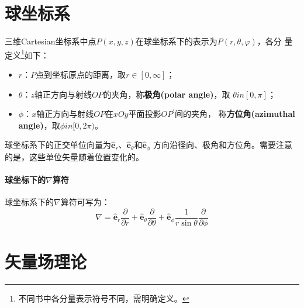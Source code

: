 \section{球坐标系}
三维Cartesian坐标系中点$P(x, y, z)$在球坐标系下的表示为$P(r, \theta, \varphi)$，各分
量定义\footnote{不同书中各分量表示符号不同，需明确定义。}如下：
\begin{itemize}
    \item $r$：$P$点到坐标原点的距离，取$r \in [0, \infty]$；
    \item $\theta$：$z$轴正方向与射线$OP$的夹角，称\textbf{极角(polar angle)}，取
                    $\theta in [0, \pi]$；
    \item $\phi$：$x$轴正方向与射线$OP$在$xOy$平面投影$OP^{\prime}$间的夹角，
                  称\textbf{方位角(azimuthal angle)}，取$\phi in [0, 2\pi)$。
\end{itemize}
球坐标系下的正交单位向量为$\hat{\bm{e}}_r$、$\hat{\bm{e}}_\theta$和$\hat{\bm{e}}_\phi$
方向沿径向、极角和方位角。需要注意的是，这些单位矢量随着位置变化的。
\paragraph*{球坐标下的$\nabla$算符}
球坐标系下的$\nabla$算符可写为：
\begin{equation}
    \nabla =  \hat{\bm{e}}_r \frac{\partial}{\partial r} 
            + \hat{\bm{e}}_\theta \frac{\partial}{\partial \theta}
            + \hat{\bm{e}}_\phi \frac{1}{r\sin{\theta}} \frac{\partial}{\partial \phi}
    \label{eq:nabla-sphere-form}
\end{equation}


\section{矢量场理论}
